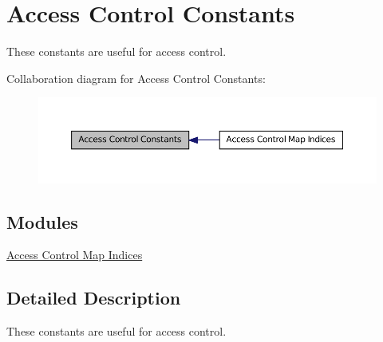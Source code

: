 \hypertarget{group__constants__acl}{
\section{Access Control Constants}
\label{group__constants__acl}
}


These constants are useful for access control.  




Collaboration diagram for Access Control Constants:\nopagebreak
\begin{figure}[H]
\begin{center}
\leavevmode
\includegraphics[width=400pt]{group__constants__acl}
\end{center}
\end{figure}


\subsection*{Modules}
\begin{DoxyCompactItemize}
\item 
\hyperlink{group__constants__acl__indices}{Access Control Map Indices}
\end{DoxyCompactItemize}


\subsection{Detailed Description}
These constants are useful for access control. 